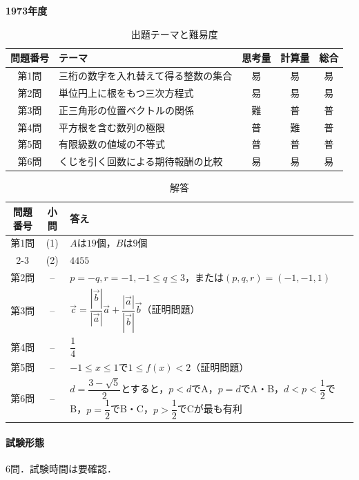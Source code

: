 \documentclass[../../main.tex]{subfiles}
\begin{document}
\begin{center}
  {\fontsize{48pt}{58pt}\selectfont \textbf{1973}\normalsize\textbf{年度}}
\end{center}

\begin{table}[htb]
  \centering
  \caption{出題テーマと難易度}
  \begin{tabular}{|c|p{6.2cm}|c|c|c|}
    \hline
    \textbf{問題番号} & \textbf{テーマ} & \textbf{思考量} & \textbf{計算量} & \textbf{総合} \\
    \hline
    第1問 & 三桁の数字を入れ替えて得る整数の集合 & 易 & 易 & 易 \\
    \hline
    第2問 & 単位円上に根をもつ三次方程式 & 易 & 易 & 易 \\
    \hline
    第3問 & 正三角形の位置ベクトルの関係 & 難 & 普 & 普 \\
    \hline
    第4問 & 平方根を含む数列の極限 & 普 & 難 & 普 \\
    \hline
    第5問 & 有限級数の値域の不等式 & 普 & 普 & 普 \\
    \hline
    第6問 & くじを引く回数による期待報酬の比較 & 易 & 易 & 易 \\
    \hline
  \end{tabular}
\end{table}

\begin{table}[htb]
  \centering
  \caption{解答}
  \renewcommand{\arraystretch}{1.4}
  \begin{tabular}{|c|c|p{9cm}|}
    \hline
    \textbf{問題番号} & \textbf{小問} & \textbf{答え} \\
    \hline
    第1問 & (1) & $A$は$19$個，$B$は$9$個 \\
    \cline{2-3}
    & (2) & $4455$ \\
    \hline
    第2問 & -- & $p=-q,r=-1,-1\le q\le3$，または$(p,q,r)=(-1,-1,1)$ \\
    \hline
    第3問 & -- & $\vec{c}=\dfrac{|\vec{b}|}{|\vec{a}|}\vec{a}+\dfrac{|\vec{a}|}{|\vec{b}|}\vec{b}$（証明問題） \\
    \hline
    第4問 & -- & $\dfrac{1}{4}$ \\
    \hline
    第5問 & -- & $-1\le x\le1$で$1\le f(x)<2$（証明問題） \\
    \hline
    第6問 & -- & $d=\dfrac{3-\sqrt{5}}{2}$とすると，$p<d$でA，$p=d$でA・B，$d<p<\dfrac{1}{2}$でB，$p=\dfrac{1}{2}$でB・C，$p>\dfrac{1}{2}$でCが最も有利 \\
    \hline
  \end{tabular}
\end{table}

\paragraph{試験形態}
6問．試験時間は要確認．
\end{document}
